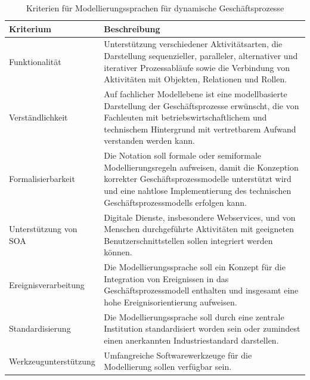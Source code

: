 \begin{table}[H]
	\centering
	\begin{tabularx}{\textwidth}{l X} 
		\toprule
		\textbf{Kriterium}  &   
		\textbf{Beschreibung}  \\ 
		\toprule
		Funktionalität &   
		Unterstützung verschiedener Aktivitätsarten, die Darstellung sequenzieller, paralleler, alternativer und iterativer Prozessabläufe sowie die Verbindung von Aktivitäten mit Objekten, Relationen und Rollen. \cite{Funk.2010b} \\  \cmidrule(r){1-1} \cmidrule(r){2-2}
		
		Verständlichkeit &   
		Auf fachlicher Modellebene ist eine modellbasierte Darstellung der Geschäftsprozesse erwünscht, die von Fachleuten mit betriebswirtschaftlichem und technischem Hintergrund mit vertretbarem Aufwand verstanden werden kann. \\ \cmidrule(r){1-1} \cmidrule(r){2-2}
		
		Formalisierbarkeit &   
		Die Notation soll formale oder semiformale Modellierungsregeln aufweisen, damit die Konzeption korrekter Geschäftsprozessmodelle unterstützt wird und eine nahtlose Implementierung des technischen Geschäftsprozessmodells erfolgen kann. \cite{Becker.2012}  \\ \cmidrule(r){1-1} \cmidrule(r){2-2}
		
		Unterstützung von \ac{SOA} &   
		Digitale Dienste, insbesondere Webservices, und von Menschen durchgeführte Aktivitäten mit geeigneten Benutzerschnittstellen sollen integriert werden können.  \\ \cmidrule(r){1-1} \cmidrule(r){2-2}
		
		Ereignisverarbeitung &   
		Die Modellierungssprache soll ein Konzept für die Integration von Ereignissen in das Geschäftsprozessmodell enthalten und insgesamt eine hohe Ereignisorientierung aufweisen.   \\ \cmidrule(r){1-1} \cmidrule(r){2-2}
		
		Standardisierung &   
		Die Modellierungssprache soll durch eine zentrale Institution standardisiert worden sein oder zumindest einen anerkannten Industriestandard darstellen. \\ \cmidrule(r){1-1} \cmidrule(r){2-2}
		
		Werkzeugunterstützung &   
		Umfangreiche Softwarewerkzeuge für die Modellierung sollen verfügbar sein.  \\
	    \bottomrule
	\end{tabularx}
	\caption[Kriterien für Modellierungssprachen]
    {Kriterien für Modellierungssprachen für dynamische Geschäftsprozesse}
    \label{tab:Kriterien für Modellierungssprachen}
\end{table}

